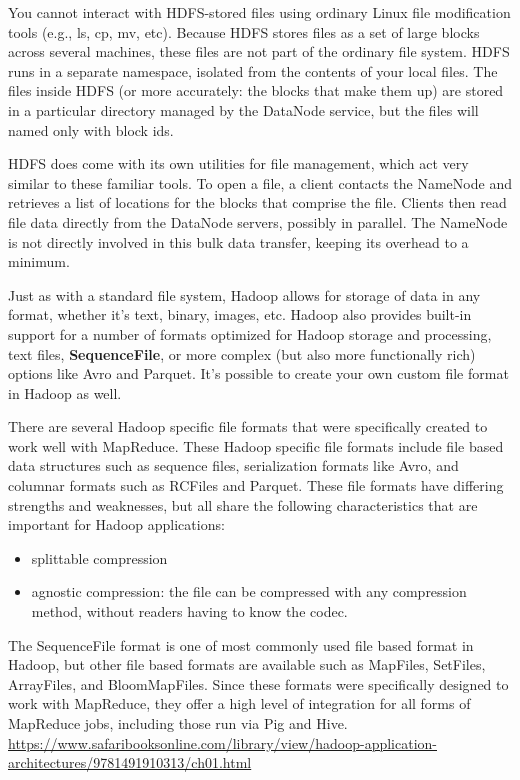 You cannot interact with HDFS-stored files using ordinary Linux file
modification tools (e.g., ls, cp, mv, etc). Because HDFS stores files as a set
of large blocks across several machines, these files are not part of the
ordinary file system. HDFS runs in a separate namespace, isolated from the
contents of your local files.
The files inside HDFS (or more accurately: the blocks that make them up) are
stored in a particular directory managed by the DataNode service, but the files
will named only with block ids.

HDFS does come with its own utilities for file management, which act very
similar to these familiar tools.
To open a file, a client contacts the NameNode and retrieves a list of locations
for the blocks that comprise the file.
Clients then read file data directly from the DataNode servers, possibly in
parallel. The NameNode is not directly involved in this bulk data transfer,
keeping its overhead to a minimum. 

Just as with a standard file system, Hadoop allows for storage of data in any
format, whether it's text, binary, images, etc. Hadoop also provides built-in
support for a number of formats optimized for Hadoop storage and processing,
text files, {\bf SequenceFile}, or more complex (but also more functionally
rich) options like Avro and Parquet. It's possible to create your own custom
file format in Hadoop as well.

There are several Hadoop specific file formats that were specifically created to
work well with MapReduce. These Hadoop specific file formats include file based
data structures such as sequence files, serialization formats like Avro, and
columnar formats such as RCFiles and Parquet.   These file formats have
differing strengths and weaknesses, but all share the following characteristics
that are important for Hadoop applications: 
\begin{itemize}
  \item splittable compression
  \item agnostic compression: the file can be compressed with any compression
  method, without readers having to know the codec.
\end{itemize}
The SequenceFile format is one of most commonly used file based format in
Hadoop, but other file based formats are available such as MapFiles, SetFiles,
ArrayFiles, and BloomMapFiles. Since these formats were specifically designed to
work with MapReduce, they offer a high level of integration for all forms of
MapReduce jobs, including those run via Pig and Hive.    
\url{https://www.safaribooksonline.com/library/view/hadoop-application-architectures/9781491910313/ch01.html}

